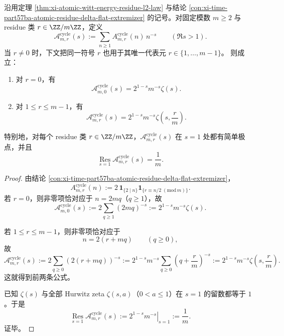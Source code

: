 \begin{theorem}\label{thm:xi-time-part77-atomic-residue-dirichlet-hurwitz-shell}
沿用定理 \ref{thm:xi-atomic-witt-energy-residue-l2-law} 与结论 \ref{con:xi-time-part57ba-atomic-residue-delta-flat-extremizer} 的记号。对固定模数 \(m\ge 2\) 与 residue 类 \(r\in \ZZ/m\ZZ\)，定义
\[
\mathcal A^{\mathrm{cycle}}_{m,r}(s)
:=
\sum_{n\ge 1}A^{\mathrm{cycle}}_{m,r}(n)\,n^{-s}
\qquad (\Re s>1).
\]
当 \(r\neq 0\) 时，下文把同一符号 \(r\) 也用于其唯一代表元 \(r\in\{1,\dots,m-1\}\)。
则成立：
\begin{enumerate}
  \item 对 \(r=0\)，有
  \[
  \mathcal A^{\mathrm{cycle}}_{m,0}(s)
  =
  2^{1-s}m^{-s}\zeta(s).
  \]
  \item 对 \(1\le r\le m-1\)，有
  \[
  \mathcal A^{\mathrm{cycle}}_{m,r}(s)
  =
  2^{1-s}m^{-s}\zeta\!\left(s,\frac{r}{m}\right).
  \]
\end{enumerate}
特别地，对每个 residue 类 \(r\in \ZZ/m\ZZ\)，\(\mathcal A^{\mathrm{cycle}}_{m,r}(s)\) 在 \(s=1\) 处都有简单极点，并且
\[
\operatorname*{Res}_{s=1}\mathcal A^{\mathrm{cycle}}_{m,r}(s)=\frac{1}{m}.
\]
\end{theorem}
\begin{proof}
由结论 \ref{con:xi-time-part57ba-atomic-residue-delta-flat-extremizer}，
\[
A_{m,r}^{\mathrm{cycle}}(n)
:=
2\,\mathbf 1_{\{2\mid n\}}\mathbf 1_{\{r\equiv n/2\;(\mathrm{mod}\,m)\}}.
\]
若 \(r=0\)，则非零项恰对应于 \(n=2mq\)（\(q\ge 1\)），故
\[
\mathcal A^{\mathrm{cycle}}_{m,0}(s)
:=
2\sum_{q\ge 1}(2mq)^{-s}
:=
2^{1-s}m^{-s}\zeta(s).
\]

若 \(1\le r\le m-1\)，则非零项恰对应于
\[
n=2(r+mq)\qquad (q\ge 0),
\]
故
\[
\mathcal A^{\mathrm{cycle}}_{m,r}(s)
:=
2\sum_{q\ge 0}(2(r+mq))^{-s}
:=
2^{1-s}m^{-s}\sum_{q\ge 0}\left(q+\frac{r}{m}\right)^{-s}
:=
2^{1-s}m^{-s}\zeta\!\left(s,\frac{r}{m}\right).
\]
这就得到前两条公式。

已知 \(\zeta(s)\) 与全部 Hurwitz zeta \(\zeta(s,a)\)（\(0<a\le 1\)）在 \(s=1\) 的留数都等于 \(1\)。于是
\[
\operatorname*{Res}_{s=1}\mathcal A^{\mathrm{cycle}}_{m,r}(s)
:=
\left.2^{1-s}m^{-s}\right|_{s=1}
:=
\frac{1}{m}.
\]
证毕。
\end{proof}

